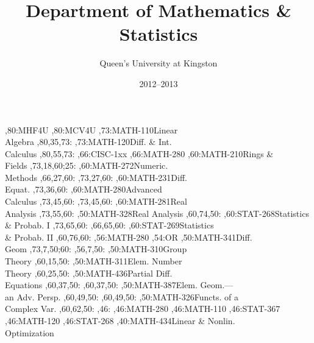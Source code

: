 \documentclass[9pt]{extarticle}
\begin{document}
\title{Department of Mathematics \& Statistics}
\author{Queen's University at Kingston}
\date{2012--2013}
\maketitle
\thispagestyle{empty}
\begin{chart}
,80:{MHF4U}
,80:{MCV4U}
,73:{MATH-110}{Linear\\Algebra}{}
  ,80,35,73:
,73:{MATH-120}{Diff. \& Int.\\Calculus}{}
  ,80,55,73:
,66:{CISC-1xx}
,66:{MATH-280}
,60:{MATH-210}{Rings \&\\Fields}{}
  ,73,18,60;25:
,60:{MATH-272}{Numeric.\\Methods}{}
  ,66,27,60:
  ,73,27,60:
,60:{MATH-231}{Diff.\\Equat.}{}
  ,73,36,60:
,60:{MATH-280}{Advanced\\Calculus}{}
  ,73,45,60:
  ,73,45,60:
,60:{MATH-281}{Real\\Analysis}{}
  ,73,55,60:
,50:{MATH-328}{Real Analysis}{}
  ,60,74,50:
,60:{STAT-268}{Statistics\\\& Probab. I}{}
  ,73,65,60:
  ,66,65,60:
,60:{STAT-269}{Statistics\\\& Probab. II}{}
  ,60,76,60:
,56:{MATH-280}
,54:{OR}
,50:{MATH-341}{Diff.\\Geom}{}
  ,73,7,50;60:
  ,56,7,50:
,50:{MATH-310}{Group\\Theory}{}
  ,60,15,50:
,50:{MATH-311}{Elem. Number\\Theory}{}
  ,60,25,50:
,50:{MATH-436}{Partial Diff.\\Equations}{}
  ,60,37,50:
  ,60,37,50:
,50:{MATH-387}{Elem. Geom.---\\an Adv. Persp.}{}
  ,60,49,50:
  ,60,49,50:
,50:{MATH-326}{Functs. of a\\Complex Var.}{}
  ,60,62,50:
,46:{}
,46:{MATH-280}
,46:{MATH-110}
,46:{STAT-367}
,46:{MATH-120}
,46:{STAT-268}
,40:{MATH-434}{Linear \& Nonlin.\\Optimization}{}

\end{chart}
\end{document}
